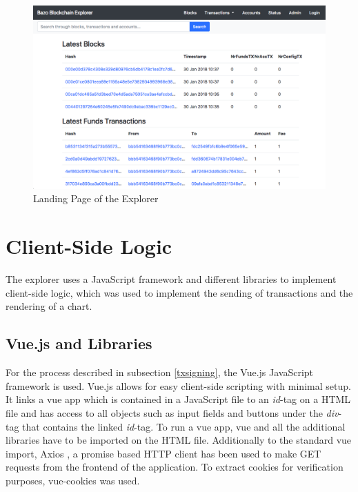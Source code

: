 \begin{figure}
  \includegraphics[scale=0.35]{landingpage.png}
  \centering
  \caption{Landing Page of the Explorer}
  \label{fig:landing}
\end{figure}

\section{Client-Side Logic} \label{sec:clientside}
The explorer uses a JavaScript \cite{javascript} framework and different libraries to implement client-side logic, which was used to implement the sending of transactions and the rendering of a chart.
\subsection{Vue.js and Libraries} \label{vuejs}
For the process described in subsection \ref{txsigning}, the Vue.js JavaScript framework \cite{vue} is used. Vue.js allows for easy client-side scripting with minimal setup. It links a vue app which is contained in a JavaScript file to an \emph{id}-tag on a HTML file and has access to all objects such as input fields and buttons under the \emph{div}-tag that contains the linked  \emph{id}-tag. To run a vue app, vue and all the additional libraries have to be imported on the HTML file. Additionally to the standard vue import, Axios , a promise based HTTP client \cite{axios} has been used to make GET requests from the frontend of the application. To extract cookies for verification purposes, vue-cookies \cite{vcookies} was used. 

